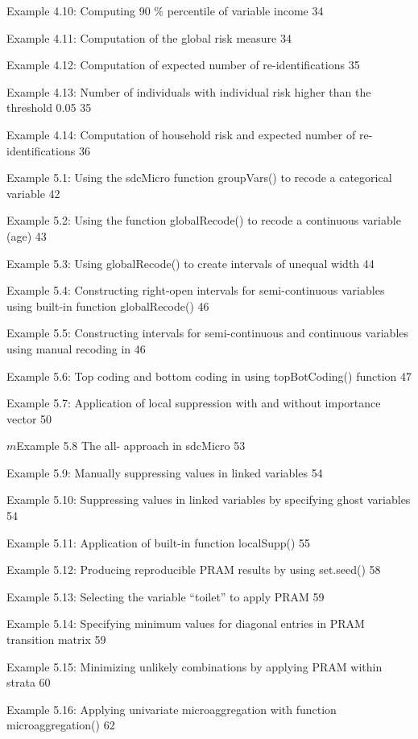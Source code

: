 \documentclass[letterpaper,10pt,english]{sphinxmanual}
\begin{document}
Example 4.10: Computing 90 \% percentile of variable income 34

Example 4.11: Computation of the global risk measure 34

Example 4.12: Computation of expected number of re-identifications 35

Example 4.13: Number of individuals with individual risk higher than the
threshold 0.05 35

Example 4.14: Computation of household risk and expected number of
re-identifications 36

Example 5.1: Using the sdcMicro function groupVars() to recode a
categorical variable 42

Example 5.2: Using the  function globalRecode() to recode a
continuous variable (age) 43

Example 5.3: Using globalRecode() to create intervals of unequal width
44

Example 5.4: Constructing right-open intervals for semi-continuous
variables using built-in  function globalRecode() 46

Example 5.5: Constructing intervals for semi-continuous and continuous
variables using manual recoding in  46

Example 5.6: Top coding and bottom coding in  using
topBotCoding() function 47

Example 5.7: Application of local suppression with and without
importance vector 50

\(m\)Example 5.8 The all- approach in sdcMicro 53

Example 5.9: Manually suppressing values in linked variables 54

Example 5.10: Suppressing values in linked variables by specifying ghost
variables 54

Example 5.11: Application of built-in  function localSupp() 55

Example 5.12: Producing reproducible PRAM results by using set.seed() 58

Example 5.13: Selecting the variable “toilet” to apply PRAM 59

Example 5.14: Specifying minimum values for diagonal entries in PRAM
transition matrix 59

Example 5.15: Minimizing unlikely combinations by applying PRAM within
strata 60

Example 5.16: Applying univariate microaggregation with 
function microaggregation() 62
\end{document}
